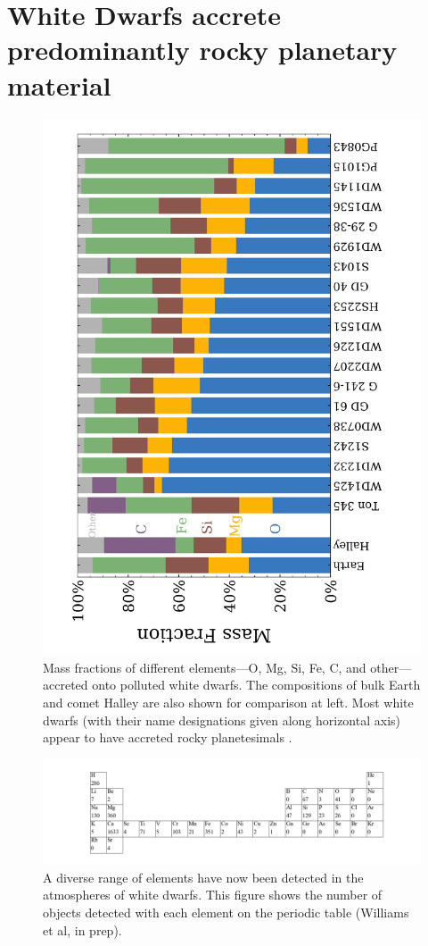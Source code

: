 \documentclass[onecolumn,authoryear]{els-mrw}
\begin{document}
\section {White Dwarfs accrete predominantly rocky planetary material}

\begin{figure}[t]
\centering
\includegraphics[angle=270, width=.7\textwidth]{xu2021_mgfeosi.pdf}
\caption{ Mass fractions of different elements—O, Mg, Si, Fe, C, and other—accreted onto polluted white dwarfs. The compositions of bulk Earth and comet Halley are also shown for comparison at left. Most white dwarfs (with their name designations given along horizontal axis) appear to have accreted rocky planetesimals \citep{XuBonsor2021Elements}. }
\label{fig:abundances}
\end{figure}

\begin{figure}[t]
\centering
\includegraphics[angle=0, width=.8\textwidth]{periodic_table_encylopedia1.png}
\caption{A diverse range of elements have now been detected in the atmospheres of white dwarfs. This figure shows the number of objects detected with each element on the periodic table (Williams et al, in prep).  }
\label{fig:williams}
\end{figure}
\end{document}
